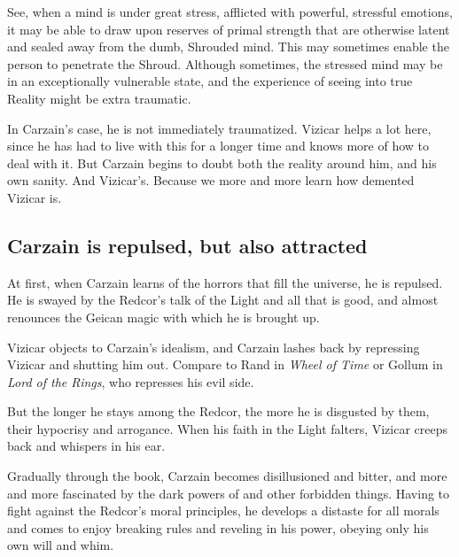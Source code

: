 \begin{garbage}
See, when a mind is under great stress, afflicted with powerful, stressful emotions, it may be able to draw upon reserves of primal strength that are otherwise latent and sealed away from the dumb, Shrouded mind. This may sometimes enable the person to penetrate the Shroud. Although sometimes, the stressed mind may be in an exceptionally vulnerable state, and the experience of seeing into true Reality might be extra traumatic. 

In Carzain's case, he is not immediately traumatized. Vizicar helps a lot here, since he has had to live with this for a longer time and knows more of how to deal with it. But Carzain begins to doubt both the reality around him, and his own sanity. And Vizicar's. Because we more and more learn how demented Vizicar is. 










\subsection{Carzain is repulsed, but also attracted}
At first, when Carzain learns of the horrors that fill the universe, he is repulsed. He is swayed by the Redcor's talk of the Light and all that is good, and almost renounces the  Geican magic with which he is brought up. 

Vizicar objects to Carzain's idealism, and Carzain lashes back by repressing Vizicar and shutting him out. Compare to Rand in \emph{Wheel of Time} or Gollum in \emph{Lord of the Rings}, who represses his evil side. 

But the longer he stays among the Redcor, the more he is disgusted by them, their hypocrisy and arrogance. When his faith in the Light falters, Vizicar creeps back and whispers in his ear. 

Gradually through the book, Carzain becomes disillusioned and bitter, and more and more fascinated by the dark powers of \nieur{} and other forbidden things. Having to fight against the Redcor's moral principles, he develops a distaste for all morals and comes to enjoy breaking rules and reveling in his power, obeying only his own will and whim. 


\end{garbage}
